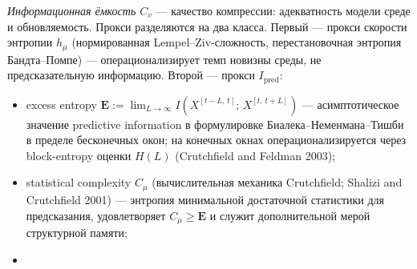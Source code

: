 \documentclass[pdflatex,sn-mathphys-ay]{sn-jnl}
\providecommand{\tightlist}{\setlength{\itemsep}{0pt}\setlength{\parskip}{0pt}}
\begin{document}
\emph{Информационная ёмкость \(C_v\)} --- качество компрессии: адекватность модели среде и обновляемость. Прокси разделяются на два класса. Первый --- прокси скорости энтропии \(h_\mu\) (нормированная Lempel--Ziv-сложность, перестановочная энтропия Бандта--Помпе) --- операционализирует темп новизны среды, не предсказательную информацию. Второй --- прокси \(I_{\text{pred}}\):

\begin{itemize}
\tightlist
\item
  excess entropy \(\mathbf{E} := \lim_{L\to\infty} I(X^{[t-L,\,t]};\, X^{[t,\,t+L]})\) --- асимптотическое значение predictive information в формулировке Биалека--Неменмана--Тишби в пределе бесконечных окон; на конечных окнах операционализируется через block-entropy оценки \(H(L)\) (Crutchfield and Feldman 2003);
\item
  statistical complexity \(C_\mu\) (вычислительная механика Crutchfield; Shalizi and Crutchfield 2001) --- энтропия минимальной достаточной статистики для предсказания, удовлетворяет \(C_\mu \ge \mathbf{E}\) и служит дополнительной мерой структурной памяти;
\item

\end{itemize}
\end{document}
